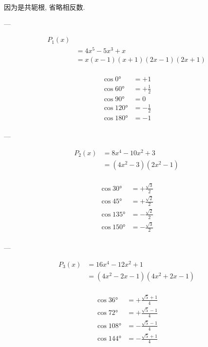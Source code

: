 \usepackage{amsmath}
\usepackage[utf8]{inputenc}
\usepackage[T1]{fontenc}


因为是共轭根, 省略相反数.

---

$$
\begin{aligned}
    P_{1}(x) \\
    &= 4 x^5-5 x^3+x\\
    &= x(x-1)(x+1)(2x-1)(2x+1)\\
\end{aligned}
$$

$$
\begin{aligned}
    \cos 0°   &= +1\\
    \cos 60°  &= +\frac{1}{2}\\
    \cos 90°  &= 0\\
    \cos 120° &= -\frac{1}{2}\\
    \cos 180° &= -1\\
\end{aligned}
$$

---

$$
\begin{aligned}
    P_{2}(x)
    &= 8 x^4-10 x^2+3\\
    &= \left(4 x^2-3\right) \left(2 x^2-1\right)\\
\end{aligned}
$$

$$
\begin{aligned}
    \cos 30°  &= +\frac{\sqrt{3}}{2}\\
    \cos 45°  &= +\frac{\sqrt{2}}{2}\\
    \cos 135° &= -\frac{\sqrt{2}}{2}\\
    \cos 150° &= -\frac{\sqrt{3}}{2}\\
\end{aligned}
$$

---

$$
\begin{aligned}
    P_{3}(x)
    &= 16 x^4-12 x^2+1\\
    &= \left(4 x^2-2 x-1\right) \left(4 x^2+2 x-1\right)\\
\end{aligned}
$$

$$
\begin{aligned}
    \cos 36°  &= +\frac{\sqrt{5}+1}{4}\\
    \cos 72°  &= +\frac{\sqrt{5}-1}{4}\\
    \cos 108° &= -\frac{\sqrt{5}-1}{4}\\
    \cos 144° &= -\frac{\sqrt{5}+1}{4}\\
\end{aligned}
$$


